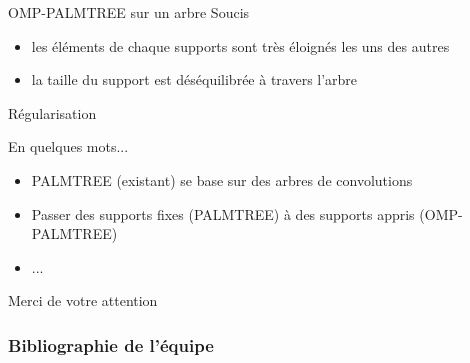 \begin{frame}{OMP-PALMTREE sur un arbre}
Soucis
\begin{itemize}
	\item les éléments de chaque supports sont très éloignés les uns des autres
	\item la taille du support est déséquilibrée à travers l'arbre
\end{itemize}
\end{frame}


\begin{frame}{Régularisation}
\end{frame}


\begin{frame}{En quelques mots...}
\begin{itemize}
\item PALMTREE (existant) se base sur des arbres de convolutions
\item Passer des supports fixes (PALMTREE) à des supports appris (OMP-PALMTREE)
\item ...
\end{itemize}
\vfill
\hfill Merci de votre attention
\end{frame}

\appendix

\begin{frame}
\frametitle{Bibliographie de l'équipe}
\nocite{*}
\printbibliography[heading=none]
\end{frame}


